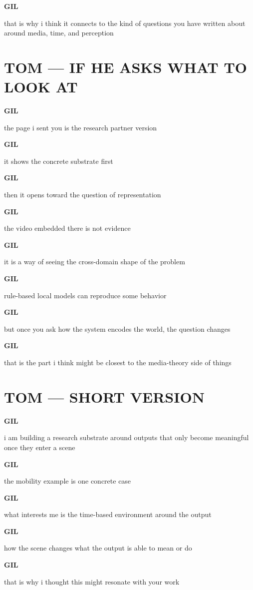 \documentclass[11pt,letterpaper]{article}
\newcommand{\gil}[1]{\par\smallskip\textbf{GIL}\par #1}
\begin{document}
\gil{that is why i think it connects to the kind of questions you have written about around media, time, and perception}

\section*{TOM --- IF HE ASKS WHAT TO LOOK AT}

\gil{the page i sent you is the research partner version}

\gil{it shows the concrete substrate first}

\gil{then it opens toward the question of representation}

\gil{the video embedded there is not evidence}

\gil{it is a way of seeing the cross-domain shape of the problem}

\gil{rule-based local models can reproduce some behavior}

\gil{but once you ask how the system encodes the world, the question changes}

\gil{that is the part i think might be closest to the media-theory side of things}

\section*{TOM --- SHORT VERSION}

\gil{i am building a research substrate around outputs that only become meaningful once they enter a scene}

\gil{the mobility example is one concrete case}

\gil{what interests me is the time-based environment around the output}

\gil{how the scene changes what the output is able to mean or do}

\gil{that is why i thought this might resonate with your work}
\end{document}
